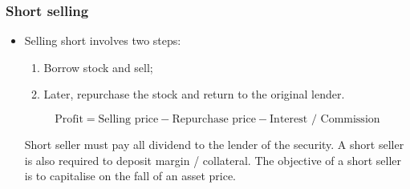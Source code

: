 \documentclass[../notes_compiled.tex]{subfiles}
\begin{document}
\subsubsection{Short selling}
\begin{itemize}
\item Selling short involves two steps:

\begin{enumerate}
\item Borrow stock and sell;
\item Later, repurchase the stock and return to the original lender.
\end{enumerate}

\begin{equation}
\text{Profit} = \text{Selling price} - \text{Repurchase price} - \text{Interest / Commission}
\end{equation}

Short seller must pay all dividend to the lender of the security. A short seller is also required to deposit margin / collateral. The objective of a short seller is to capitalise on the fall of an asset price.

\end{itemize}
\end{document}
